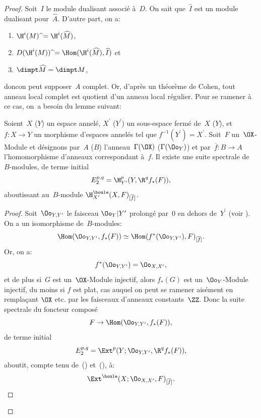 \begin{proof}
Soit~$I$ le module dualisant associ\'e \`a~$D$. On sait que~$\widehat{I}$ est un module dualisant pour~$\widehat{A}$. D'autre part, on a:
\begin{enumerate}
\item[] $\H^{i}(M)\;\widehat{\hbox{}}=\H^{i}(\widehat{M})$,
\item[] $D(\H^{i}(M))\;\widehat{\hbox{}}=\Hom(\H^{i}(\widehat{M}), \widehat{I})$ et
\item[] $\dimpt\widehat{M}=\dimpt M$,
\end{enumerate}
\noindent
donc\pageoriginale on peut supposer~$A$ complet. Or, d'apr\`es un th\'eor\`eme de Cohen, tout anneau local complet est quotient d'un anneau local r\'egulier. Pour se ramener \`a ce cas, on~a besoin du lemme suivant:

\begin{lemme} \label{V.3.2}
Soient~$X$ (\resp $Y$) un espace annel\'e, $X^{\prime}$ (\resp $Y^{\prime}$) un sous-espace ferm\'e de~$X$ (\resp $Y$), et $f\colon X\to Y$ un morphisme d'espaces annel\'es tel que $f^{-1}(Y^{\prime})=X^{\prime}$. Soit~$F$ un~$\OX$-Module et d\'esignons par~$A$ (\resp $B$) l'anneau~$\Gamma(\OX)$ (\resp $\Gamma(\Oo_{Y})$) et par~$\overline{f}\colon B\to A$ l'homomorphisme d'anneaux correspondant \`a~$f$. Il existe une suite spectrale de~$B$-modules, de terme initial
\begin{equation} \label{eq:V.15} E_{2}^{p, q}=\H_{Y^{\prime}}^{p}(Y, \R^{q}f_{\ast}(F)),
\end{equation}
aboutissant au~$B$-module $\H_{X^{\prime}}^{\boule}(X, F)_{[\overline{f}]}$.
\end{lemme}

\begin{proof}
Soit~$\Oo_{Y, Y^{\prime}}$ le faisceau ${\Oo_{Y}}{|Y^{\prime}}$ prolong\'e par~$0$ en dehors de~$Y^{\prime}$ (voir \Exp {}). On a un isomorphisme de~$B$-modules:
\begin{equation} \label{eq:V.16} \Hom(\Oo_{Y, Y^{\prime}}, f_{\ast}(F))\simeq\Hom(f^{\ast}(\Oo_{Y, Y^{\prime}}), F)_{[\overline{f}]}.
\end{equation}
Or, on a:
\begin{equation} \label{eq:V.17} f^{\ast}(\Oo_{Y, Y^{\prime}})=\Oo_{X, X^{\prime}},
\end{equation}
et de plus si~$G$ est un~$\OX$-Module injectif, alors
$f_{\ast}(G)$ est un~$\Oo_{Y}$-Module injectif, du moins si $f$
est plat, cas auquel on peut se ramener ais\'ement en rempla\c cant
$\OX$ etc. par les faisceaux d'anneaux constants~$\ZZ$. Donc la
suite spectrale du foncteur compos\'e
$$F\to\Hom(\Oo_{Y, Y^{\prime}}, f_{\ast}(F)),
$$
de terme initial
$$E_{2}^{p, q}=\Ext^{p}(Y;\Oo_{Y, Y^{\prime}}, \R^{q}f_{\ast}(F)),
$$
aboutit, compte tenu de~() et~(), \`a:
$$
\Ext^{\boule}(X;\Oo_{X, X^{\prime}}, F)_{[\overline{f}]}.
$$


\end{proof}
\end{proof}
